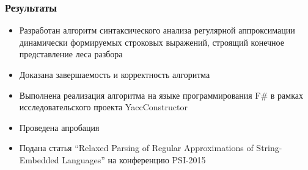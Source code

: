 \documentclass{beamer}
\begin{document}
\begin{frame}
  \transwipe[direction=90]
  \frametitle{Результаты}
  \begin{itemize}
    \item Разработан алгоритм синтаксического анализа регулярной аппроксимации динамически формируемых строковых выражений, строящий конечное представление леса разбора
    \item Доказана завершаемость и корректность алгоритма
    \item Выполнена реализация алгоритма на языке программирования F\# в рамках исследовательского проекта YaccConstructor
    \item Проведена апробация
  \end{itemize}

  \begin{itemize}
    \item Подана статья ``Relaxed Parsing of Regular Approximations of String-Embedded Languages'' на конференцию PSI-2015
  \end{itemize}
\end{frame}
\end{document}
